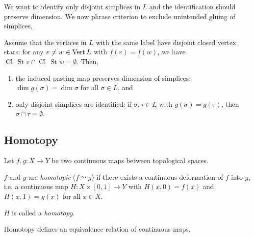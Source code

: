 \begin{multicols*}{3}
{\myfont  We want to identify only disjoint simplices in $L$ and the identification should preserve dimension.
We now phrase criterion to exclude unintended gluing of simplices.} \vspace{-0.5pc}
\begin{rem}
Assume that the vertices in $L$ with the same label have disjoint closed vertex stars: for any $v \neq w \in \operatorname{Vert} L$ with $f(v)=f(w)$, we have $\operatorname{Cl}\, \operatorname{St} v \cap \operatorname{Cl}\, \operatorname{St} w = \emptyset$. Then,
\begin{enumerate}[itemsep = 0pt]
\item the induced pasting map preserves dimension of simplices: $\dim g(\sigma)= \dim \sigma$ for all $\sigma \in L$, and
\item only disjoint simplices are identified: if $\sigma, \tau \in L$ with $g(\sigma) = g(\tau)$, then $\sigma \cap \tau = \emptyset$.
\end{enumerate}
\end{rem}
\rspace
\drawaline \vspace{-0.5pc}
\subsection{Homotopy} 
Let $f,g: X\to Y$ be two continuous maps  between topological spaces.\vspace{-0.5pc}
\begin{definition}[Homotopic] $f$ and $g$ are \emph{homotopic} ($f\simeq g$) if there exists a continuous deformation of $f$ into $g$, i.e. a continuous map $H:X\times [0,1] \to Y$ with $H(x,0)=f(x)$ and $H(x,1) = y(x)$ for all $x\in X$.
\end{definition}
\rspace
\begin{defi}[Homotopy]
$H$ is called a \emph{homotopy}.
\end{defi}
\rspace
\begin{remark}
Homotopy defines an equivalence relation of continuous maps.
\end{remark}
\rspace
\drawaline \vspace{-0.5pc}

\end{multicols*}
